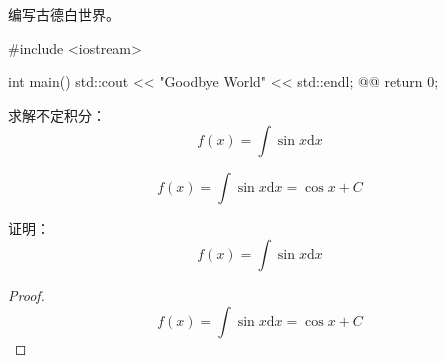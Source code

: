 \documentclass[answer,sheet]{cuzexam} %
\begin{document}
\begin{studentanswer}
    \newpage
\end{studentanswer}

\begin{problem}
    编写古德白世界。
\end{problem}

\begin{solution}
    \begin{cppcode}
        #include <iostream> 
        
        int main() {
            std::cout << "Goodbye World" << std::endl; @@
            return 0;
        }
    \end{cppcode}
\end{solution}

\begin{studentanswer}
    \newpage
\end{studentanswer}


\begin{problem}
    求解不定积分：
    $$f(x)=\int\sin{x}\mathrm{d}x$$
\end{problem}

\begin{solution}
    $$f(x)=\int\sin{x}\mathrm{d}x=\cos{x}+C$$
\end{solution}

\begin{studentanswer}
    \newpage
\end{studentanswer}



\begin{problem}
    证明：
    $$f(x)=\int\sin{x}\mathrm{d}x$$
\end{problem}

\begin{proof}
    $$f(x)=\int\sin{x}\mathrm{d}x=\cos{x}+C$$
\end{proof}

\begin{studentanswer}
    \newpage
\end{studentanswer}
\end{document}
